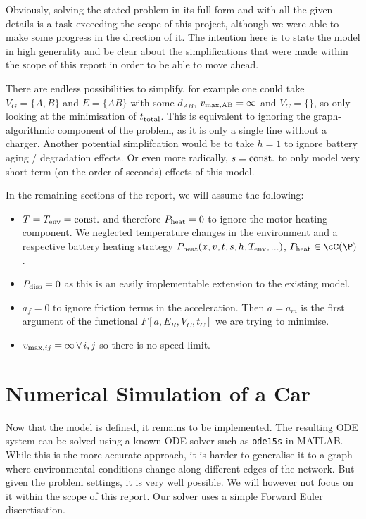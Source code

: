 \documentclass{prettytex/ox/mmsc-special-topic}
\begin{document}
  Obviously, solving the stated problem in its full form and with all the given details is a task exceeding the scope of this project, although we were able to make some progress in the direction of it.
  The intention here is to state the model in high generality and be clear about the simplifications that were made within the scope of this report in order to be able to move ahead.

  There are endless possibilities to simplify, for example one could take
  $V_G = \{A, B\}$ and $E = \{AB\}$ with some $d_{AB}$, $v_{\rm max, AB} = \infty$ and $V_C = \{\}$, so only looking at the minimisation of $t_{\rm total}$. This is equivalent to ignoring the graph-algorithmic component of the problem, as it is only a single line without a charger.
  Another potential simplifcation would be to take $h = 1$ to ignore battery aging / degradation effects. Or even more radically, $s = \rm const.$ to only model very short-term (on the order of seconds) effects of this model.

  In the remaining sections of the report, we will assume the following:
  \begin{itemize}
    \tightlist
    \item $T = T_{\rm env} = \rm const.$ and therefore $P_{\rm heat} = 0$ to ignore the motor heating component. We neglected temperature changes in the environment and a respective battery heating strategy $P_{\rm heat}(x, v, t, s, h, T_{\rm env}, ...)$, $P_{\rm heat} \in \cC(\P)$.
    \item $P_{\rm diss} = 0$ as this is an easily implementable extension to the existing model.
    \item $a_f = 0$ to ignore friction terms in the acceleration. Then $a = a_m$ is the first argument of the functional $F[a, E_R, V_C, t_C]$ we are trying to minimise.
    \item $v_{{\rm max}, ij} = \infty \,\forall\, i, j$ so there is no speed limit.
  \end{itemize}

  \section{Numerical Simulation of a Car}
  Now that the model is defined, it remains to be implemented.
  The resulting ODE system can be solved using a known ODE solver such as \texttt{ode15s} in MATLAB.
  While this is the more accurate approach, it is harder to generalise it to a graph where environmental conditions change along different edges of the network.
  But given the problem settings, it is very well possible.
  We will however not focus on it within the scope of this report.
  Our solver uses a simple Forward Euler discretisation.
\end{document}
